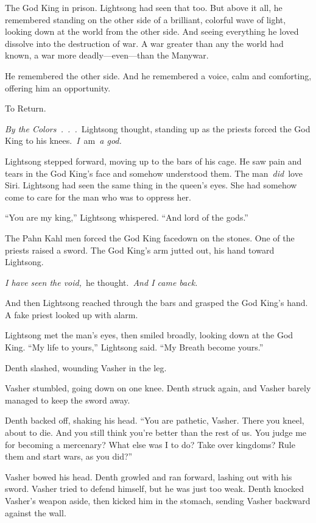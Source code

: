 The God King in prison. Lightsong had seen that too. But above it all, he remembered standing on the other side of a brilliant, colorful wave of light, looking down at the world from the other side. And seeing everything he loved dissolve into the destruction of war. A war greater than any the world had known, a war more deadly—even—than the Manywar.

He remembered the other side. And he remembered a voice, calm and comforting, offering him an opportunity.

To Return.

\textit{By the Colors~.~.~.}~Lightsong thought, standing up as the priests forced the God King to his knees.~\textit{I}~am~\textit{a god.}

Lightsong stepped forward, moving up to the bars of his cage. He saw pain and tears in the God King’s face and somehow understood them. The man~\textit{did}~love Siri. Lightsong had seen the same thing in the queen’s eyes. She had somehow come to care for the man who was to oppress her.

“You are my king,” Lightsong whispered. “And lord of the gods.”

The Pahn Kahl men forced the God King facedown on the stones. One of the priests raised a sword. The God King’s arm jutted out, his hand toward Lightsong.

\textit{I have seen the void,}~he thought.~\textit{And I came back.}

And then Lightsong reached through the bars and grasped the God King’s hand. A fake priest looked up with alarm.

Lightsong met the man’s eyes, then smiled broadly, looking down at the God King. “My life to yours,” Lightsong said. “My Breath become yours.”

\orn

Denth slashed, wounding Vasher in the leg.

Vasher stumbled, going down on one knee. Denth struck again, and Vasher barely managed to keep the sword away.

Denth backed off, shaking his head. “You are pathetic, Vasher. There you kneel, about to die. And you still think you’re better than the rest of us. You judge me for becoming a mercenary? What else was I to do? Take over kingdoms? Rule them and start wars, as you did?”

Vasher bowed his head. Denth growled and ran forward, lashing out with his sword. Vasher tried to defend himself, but he was just too weak. Denth knocked Vasher’s weapon aside, then kicked him in the stomach, sending Vasher backward against the wall.

